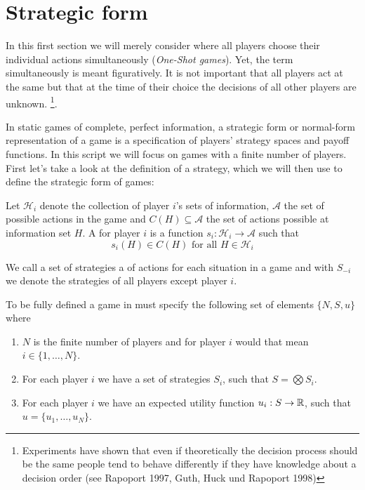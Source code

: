 
\section{Strategic form}

In this first section we will merely consider  where all players choose their individual actions simultaneously (\textit{One-Shot games}). Yet, the term simultaneously is meant figuratively. It is not important that all players act at the same but that at the time of their choice the decisions of all other players are unknown. \footnote{Experiments have shown that even if theoretically the decision process should be the same people tend to behave differently if they have knowledge about a decision order  (see Rapoport 1997, Guth, Huck und Rapoport 1998)}.

In static games of complete, perfect information, a strategic form or normal-form representation of a game is a specification of players' strategy spaces and payoff functions. In this script we will focus on games with a finite number of players. \\

First let's take a look at the definition of a strategy, which we will then use to define the strategic form of games: 

\begin{definition}[Strategy]
	Let $\mathcal{H}_{i}$ denote the collection of player $i$'s sets of information, $\mathcal{A}$ the set of possible actions in the game and $C(H) \subseteq \mathcal{A}$ the set of actions possible at information set $H$. A  for player $i$ is a function $s_{i} \colon \mathcal{H}_{i} \rightarrow \mathcal{A}$ such that
	\[ s_{i}(H) \in C(H) \text{ for all } H \in \mathcal{H}_{i} \]
\end{definition}

We call a set of strategies a  of actions for each situation in a game and with $S_{-i}$ we denote the strategies of all players except player $i$.\\

\begin{definition}
To be fully defined a game in  must specify the following set of elements $\{ N, S, u \}$ where
	\begin{enumerate}
		\item $N$ is the finite number of players and for player $i$ would that mean $i \in \{ 1, \dotsc, N \}$.
		\item For each player $i$ we have a set of strategies $S_{i}$, such that $S = \bigotimes S_{i}$.
		\item For each player $i$ we have an expected utility function $u_{i} : S \rightarrow \mathbb{R}$, such that $u = \{ u_{1}, \dotsc, u_{N} \}$.
	\end{enumerate}
\end{definition}




